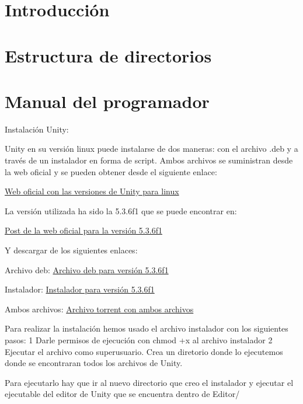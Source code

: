 
\section{Introducción}

\section{Estructura de directorios}

\section{Manual del programador}
Instalación Unity:

Unity en su versión linux puede instalarse de dos maneras: con el archivo .deb y a través de un instalador en forma de script. Ambos archivos se suministran desde la web oficial y se pueden obtener desde el siguiente enlace:

\href{https://forum.unity3d.com/threads/unity-on-linux-release-notes-and-known-issues.350256/}{Web oficial con las versiones de Unity para linux}

La versión utilizada ha sido la 5.3.6f1 que se puede encontrar en:

\href{https://forum.unity3d.com/threads/unity-on-linux-release-notes-and-known-issues.350256/#post-2717623}{Post de la web oficial para la versión 5.3.6f1}

Y descargar de los siguientes enlaces:

Archivo deb: \href{http://download.unity3d.com/download_unity/linux/unity-editor-5.3.6f1+20160720_amd64.deb}{Archivo deb para versión 5.3.6f1}

Instalador: \href{http://download.unity3d.com/download_unity/linux/unity-editor-installer-5.3.6f1+20160720.sh}{Instalador para versión 5.3.6f1}

Ambos archivos: \href{http://files.unity3d.com/levi/unity-editor-5.3.6f1+20160720.torrent}{Archivo torrent con ambos archivos}

Para realizar la instalación hemos usado el archivo instalador con los siguientes pasos:
1 Darle permisos de ejecución con chmod +x al archivo instalador
2 Ejecutar el archivo como superusuario. Crea un diretorio donde lo ejecutemos donde se encontraran todos los archivos de Unity.

Para ejecutarlo hay que ir al nuevo directorio que creo el instalador y ejecutar el ejecutable del editor de Unity que se encuentra dentro de Editor/ 

